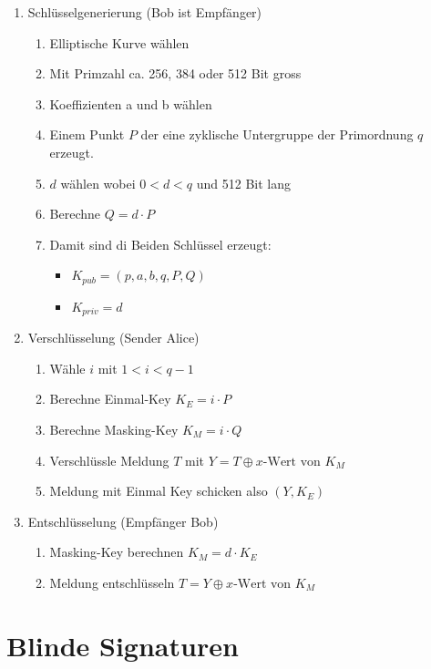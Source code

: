 \documentclass[12pt]{scrartcl}
\begin{document}
\begin{enumerate}
    \item Schlüsselgenerierung (Bob ist Empfänger)
    \begin{enumerate}
        \item Elliptische Kurve wählen
        \item Mit Primzahl ca. 256, 384 oder 512 Bit gross
        \item Koeffizienten a und b wählen
        \item Einem Punkt $P$ der eine zyklische Untergruppe der Primordnung $q$ erzeugt.
        \item $d$ wählen wobei $ 0 < d < q $ und 512 Bit lang
        \item Berechne $Q = d \cdot P$
        \item Damit sind di Beiden Schlüssel erzeugt:
        \begin{itemize}
            \item[] $K_{pub} = (p, a, b, q, P, Q)$ 
            \item[] $K_{priv} = d$
        \end{itemize}
    \end{enumerate}
    \item Verschlüsselung (Sender Alice)
    \begin{enumerate}
        \item Wähle $i$ mit $1 < i < q - 1$
        \item Berechne Einmal-Key $K_E = i \cdot P$
        \item Berechne Masking-Key $K_M = i \cdot Q$
        \item Verschlüssle Meldung $T$ mit $Y = T \oplus x \text{-Wert von } K_M$
        \item Meldung mit Einmal Key schicken also $(Y, K_E)$
    \end{enumerate}
    \item Entschlüsselung (Empfänger Bob)
    \begin{enumerate}
        \item Masking-Key berechnen $K_M = d \cdot K_E$
        \item Meldung entschlüsseln $T = Y \oplus x \text{-Wert von } K_M$
    \end{enumerate}
\end{enumerate}

\newpage
\section{Blinde Signaturen}
\end{document}
